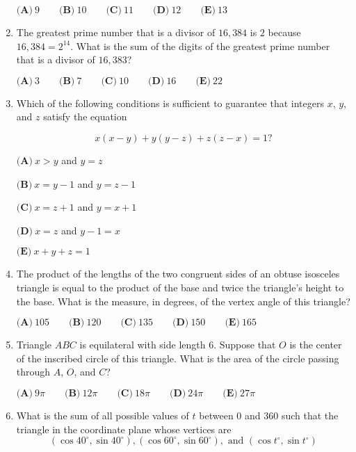 \documentclass{article}
\begin{document}
\begin{enumerate}[label=\arabic*., itemsep=0.5em]
\(\textbf{(A)}\ 9 \qquad\textbf{(B)}\  10 \qquad\textbf{(C)}\  11 \qquad\textbf{(D)}\ 12 \qquad\textbf{(E)}\ 13\)\par \vspace{0.5em}\item The greatest prime number that is a divisor of \(16{,}384\) is \(2\) because \(16{,}384 = 2^{14}\). What is the sum of the digits of the greatest prime number that is a divisor of \(16{,}383\)?

\(\textbf{(A)} \: 3\qquad\textbf{(B)} \: 7\qquad\textbf{(C)} \: 10\qquad\textbf{(D)} \: 16\qquad\textbf{(E)} \: 22\)\par \vspace{0.5em}\item Which of the following conditions is sufficient to guarantee that integers \(x\), \(y\), and \(z\) satisfy the equation

\begin{equation*}
x(x-y)+y(y-z)+z(z-x) = 1?
\end{equation*}


\(\textbf{(A)} \: x>y\) and \(y=z\)

\(\textbf{(B)} \: x=y-1\) and \(y=z-1\)

\(\textbf{(C)} \: x=z+1\) and \(y=x+1\)

\(\textbf{(D)} \: x=z\) and \(y-1=x\)

\(\textbf{(E)} \: x+y+z=1\)\par \vspace{0.5em}\item The product of the lengths of the two congruent sides of an obtuse isosceles triangle is equal to the product of the base and twice the triangle's height to the base. What is the measure, in degrees, of the vertex angle of this triangle?

\(\textbf{(A)} \: 105 \qquad\textbf{(B)} \: 120 \qquad\textbf{(C)} \: 135 \qquad\textbf{(D)} \: 150 \qquad\textbf{(E)} \: 165\)\par \vspace{0.5em}\item Triangle \(ABC\) is equilateral with side length \(6\). Suppose that \(O\) is the center of the inscribed
circle of this triangle. What is the area of the circle passing through \(A\), \(O\), and \(C\)?

\(\textbf{(A)} \: 9\pi \qquad\textbf{(B)} \: 12\pi \qquad\textbf{(C)} \: 18\pi \qquad\textbf{(D)} \: 24\pi \qquad\textbf{(E)} \: 27\pi\)\par \vspace{0.5em}\item What is the sum of all possible values of \(t\) between \(0\) and \(360\) such that the triangle in the coordinate plane whose vertices are 
\begin{equation*}
(\cos 40^\circ,\sin 40^\circ), (\cos 60^\circ,\sin 60^\circ), \text{ and } (\cos t^\circ,\sin t^\circ)
\end{equation*}


\end{enumerate}
\end{document}
